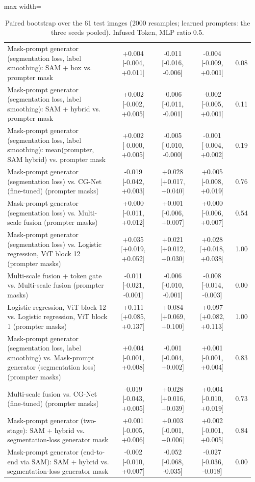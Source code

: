 \begin{table}[htbp]
\begin{adjustbox}{max width=\linewidth}
\begin{tabular}{lcccc}
Mask-prompt generator (segmentation loss, label smoothing): SAM + box vs. prompter mask & +0.004 [-0.004, +0.011] & -0.011 [-0.016, -0.006] & -0.004 [-0.009, +0.001] & 0.08 \\
Mask-prompt generator (segmentation loss, label smoothing): SAM + hybrid vs. prompter mask & +0.002 [-0.002, +0.005] & -0.006 [-0.011, -0.001] & -0.002 [-0.005, +0.001] & 0.11 \\
Mask-prompt generator (segmentation loss, label smoothing): mean(prompter, SAM hybrid) vs. prompter mask & +0.002 [-0.000, +0.005] & -0.005 [-0.010, -0.000] & -0.001 [-0.004, +0.002] & 0.19 \\
Mask-prompt generator (segmentation loss) vs. CG-Net (fine-tuned) (prompter masks) & -0.019 [-0.042, +0.003] & +0.028 [+0.017, +0.040] & +0.005 [-0.008, +0.019] & 0.76 \\
Mask-prompt generator (segmentation loss) vs. Multi-scale fusion (prompter masks) & +0.000 [-0.011, +0.012] & +0.001 [-0.006, +0.007] & +0.000 [-0.006, +0.007] & 0.54 \\
Mask-prompt generator (segmentation loss) vs. Logistic regression, ViT block 12 (prompter masks) & +0.035 [+0.019, +0.052] & +0.021 [+0.012, +0.030] & +0.028 [+0.018, +0.038] & 1.00 \\
Multi-scale fusion + token gate vs. Multi-scale fusion (prompter masks) & -0.011 [-0.021, -0.001] & -0.006 [-0.010, -0.001] & -0.008 [-0.014, -0.003] & 0.00 \\
Logistic regression, ViT block 12 vs. Logistic regression, ViT block 1 (prompter masks) & +0.111 [+0.085, +0.137] & +0.084 [+0.069, +0.100] & +0.097 [+0.082, +0.113] & 1.00 \\
Mask-prompt generator (segmentation loss, label smoothing) vs. Mask-prompt generator (segmentation loss) (prompter masks) & +0.004 [-0.001, +0.008] & -0.001 [-0.004, +0.002] & +0.001 [-0.001, +0.004] & 0.83 \\
Multi-scale fusion vs. CG-Net (fine-tuned) (prompter masks) & -0.019 [-0.043, +0.005] & +0.028 [+0.016, +0.039] & +0.004 [-0.010, +0.019] & 0.73 \\
Mask-prompt generator (two-stage): SAM + hybrid vs. segmentation-loss generator mask & +0.001 [-0.005, +0.006] & +0.003 [-0.001, +0.006] & +0.002 [-0.001, +0.005] & 0.84 \\
Mask-prompt generator (end-to-end via SAM): SAM + hybrid vs. segmentation-loss generator mask & -0.002 [-0.010, +0.007] & -0.052 [-0.068, -0.035] & -0.027 [-0.036, -0.018] & 0.00 \\
\bottomrule
\end{tabular}
\end{adjustbox}
\caption{Paired bootstrap over the 61 test images (2000 resamples; learned prompters: the three seeds pooled). Infused Token, MLP ratio 0.5.}
\label{tab:bootstrap_infused_mlp05}
\end{table}
